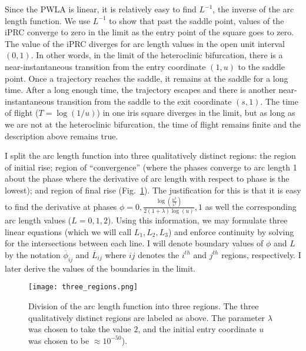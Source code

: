 Since the PWLA is linear, it is relatively easy to find $L^{-1}$, the inverse of the arc length function.  We use $L^{-1}$ to show that past the saddle point, values of the iPRC converge to zero in the limit as the entry point of the square goes to zero.  The value of the iPRC diverges for arc length values in the open unit interval $(0,1)$.  In other words, in the limit of the heteroclinic bifurcation, there is a near-instantaneous transition from the entry coordinate $(1,u)$ to the saddle point.  Once a trajectory reaches the saddle, it remains at the saddle for a long time.  After a long enough time, the trajectory escapes and there is another near-instantaneous transition from the saddle to the exit coordinate $(s,1)$.  The time of flight ($T = \log(1/u)$) in one iris square diverges in the limit, but as long as we are not at the heteroclinic bifurcation, the time of flight remains finite and the description above remains true.

I split the arc length function into three qualitatively distinct regions: the region of initial rise; region of ``convergence'' (where the phases converge to arc length 1 about the phase where the derivative of arc length with respect to phase is the lowest); and region of final rise (Fig.~\ref{arclengthregions}).  The justification for this is that it is easy to find the derivative at phases $\phi = 0, \frac{\log(\frac{u^2}{\lambda^3})}{2(1+\lambda)\log(u)}, 1$ as well the corresponding arc length values ($L = 0, 1, 2$).  Using this information, we may formulate three linear equations (which we will call $L_1, L_2, L_3$) and enforce continuity by solving for the intersections between each line.  I will denote boundary values of $\phi$ and $L$ by the notation $\overline\phi_{ij}$ and $\overline L_{ij}$ where $ij$ denotes the $i^{th}$ and $j^{th}$ regions, respectively.  I later derive the values of the boundaries in the limit.

\begin{figure}[h!]
\begin{center}
\texttt{[image: three\_regions.png]}
\caption[Division of the arc length function into three regions]{Division of the arc length function into three regions.  The three qualitatively distinct regions are labeled as above.  The parameter $\lambda$ was chosen to take the value $2$, and the initial entry coordinate $u$ was chosen to be $\approx 10^{-50}$).}\label{arclengthregions}
\end{center}
\end{figure}

